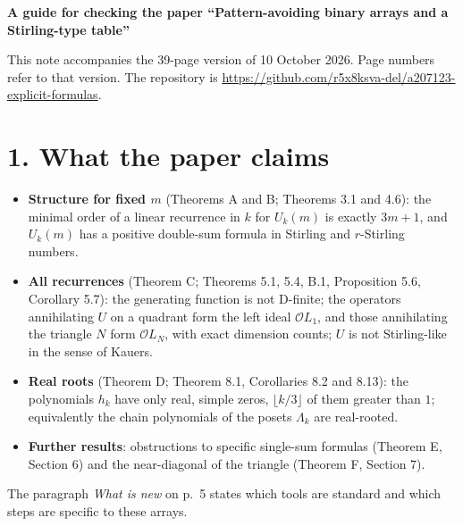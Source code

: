 \documentclass[10pt]{article}
\newcommand{\cO}{\mathcal{O}}
\begin{document}
{\large\bfseries A guide for checking the paper ``Pattern-avoiding binary arrays and a Stirling-type table''}\par
\smallskip
This note accompanies the 39-page version of 10 October 2026. Page numbers refer to that version. The repository is \url{https://github.com/r5x8ksva-del/a207123-explicit-formulas}.

\section*{1. What the paper claims}
\begin{itemize}
\item \textbf{Structure for fixed $m$} (Theorems A and B; Theorems 3.1 and 4.6): the minimal order of a linear recurrence in $k$ for $U_k(m)$ is exactly $3m+1$, and $U_k(m)$ has a positive double-sum formula in Stirling and $r$-Stirling numbers.
\item \textbf{All recurrences} (Theorem C; Theorems 5.1, 5.4, B.1, Proposition 5.6, Corollary 5.7): the generating function is not D-finite; the operators annihilating $U$ on a quadrant form the left ideal $\cO L_1$, and those annihilating the triangle $N$ form $\cO L_N$, with exact dimension counts; $U$ is not Stirling-like in the sense of Kauers.
\item \textbf{Real roots} (Theorem D; Theorem 8.1, Corollaries 8.2 and 8.13): the polynomials $h_k$ have only real, simple zeros, $\lfloor k/3\rfloor$ of them greater than $1$; equivalently the chain polynomials of the posets $\Lambda_k$ are real-rooted.
\item \textbf{Further results}: obstructions to specific single-sum formulas (Theorem E, Section 6) and the near-diagonal of the triangle (Theorem F, Section 7).
\end{itemize}
The paragraph \emph{What is new} on p.~5 states which tools are standard and which steps are specific to these arrays.
\end{document}
